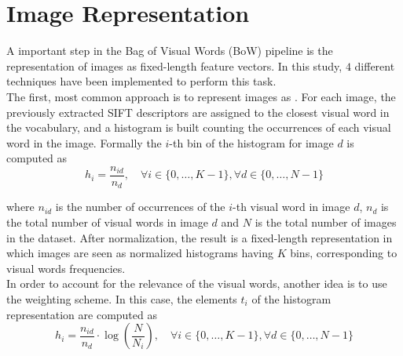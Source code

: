 \documentclass[../main.tex]{subfiles}
\begin{document}
\section{Image Representation}\label{sec:image-representation}

A important step in the Bag of Visual Words (BoW) pipeline is the representation
of images as fixed-length feature vectors. In this study, $4$ different
techniques have been implemented to perform this task.\\
The first, most common approach is to represent images as . For each image, the previously extracted SIFT descriptors are
assigned to the closest visual word in the vocabulary, and a histogram is built
counting the occurrences of each visual word in the image. Formally the $i$-th
bin of the histogram for image $d$ is computed as
\begin{equation}
	h_i = \frac{n_{id}}{n_{d}},
	\quad
	\forall i \in \{0, \ldots, K-1\},
	\forall d \in \{0, \ldots, N-1\}
\end{equation}

where 
$n_{id}$ is the number of occurrences of the $i$-th visual word in image $d$,
$n_{d}$ is the total number of visual words in image $d$ 
and $N$ is the total number of images in the dataset.
After normalization,
the result is a fixed-length representation in which images are seen as
normalized histograms having $K$ bins, corresponding to visual words
frequencies.\\
In order to account for the relevance of the visual words, another idea is to
use the  weighting
scheme. In this case, the elements $t_i$ of the histogram representation are computed
as
\begin{equation}
	h_i = \frac{n_{id}}{n_{d}} \cdot \log\left(\frac{N}{N_i}\right),
	\quad 
	\forall i \in \{0, \ldots, K-1\}, 
	\forall d \in \{0, \ldots, N-1\}
\end{equation}
\end{document}
